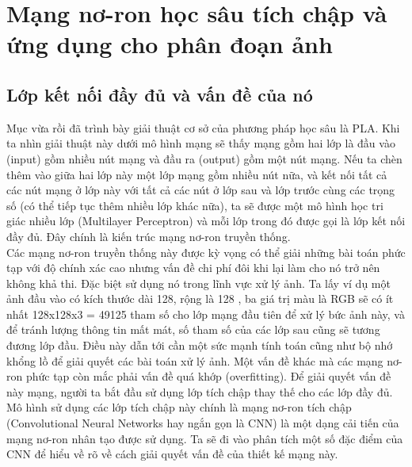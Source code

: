 \section{Mạng nơ-ron học sâu tích chập và ứng dụng cho phân đoạn ảnh}



\subsection{Lớp kết nối đầy đủ và vấn đề của nó}
Mục vừa rồi đã trình bày giải thuật cơ sở của phương pháp học sâu là PLA. Khi ta nhìn giải thuật này dưới mô hình mạng sẽ thấy mạng gồm hai lớp là đầu vào (input) gồm nhiều nút mạng và đầu ra (output) gồm một nút mạng. Nếu ta chèn thêm vào giữa hai lớp này một lớp mạng gồm nhiều nút nữa, và kết nối tất cả các nút mạng ở lớp này với tất cả các nút ở lớp sau và lớp trước cùng các trọng số (có thể tiếp tục thêm nhiều lớp khác nữa), ta sẽ được một mô hình học tri giác nhiều lớp (Multilayer Perceptron) và mỗi lớp trong đó được gọi là lớp kết nối đầy đủ. Đây chính là kiến trúc mạng nơ-ron truyền thống.\\
Các mạng nơ-ron truyền thống này được kỳ vọng có thể giải những bài toán phức tạp với độ chính xác cao nhưng vấn đề chi phí đôi khi lại làm cho nó trở nên không khả thi. Đặc biệt sử dụng nó trong lĩnh vực xử lý ảnh. Ta lấy ví dụ một ảnh đầu vào có kích thước dài 128, rộng là 128 , ba giá trị màu là RGB sẽ có ít nhất 128x128x3 = 49125 tham số cho lớp mạng đầu tiên để xử lý bức ảnh này, và để tránh lượng thông tin mất mát, số tham số của các lớp sau cũng sẽ tương đương lớp đầu. Điều này dẫn tới cần một sức mạnh tính toán cũng như bộ nhớ khổng lồ để giải quyết các bài toán xử lý ảnh. Một vấn đề khác mà các mạng nơ-ron phức tạp còn mắc phải vấn đề quá khớp (overfitting). Để giải quyết vấn đề này mạng, người ta bắt đầu sử dụng lớp tích chập thay thế cho các lớp đầy đủ. Mô hình sử dụng các lớp tích chập này chính là mạng nơ-ron tích chập (Convolutional Neural Networks hay ngắn gọn là CNN) là một dạng cải tiến của mạng nơ-ron nhân tạo được sử dụng. Ta sẽ đi vào phân tích một số đặc điểm của CNN để hiểu về rõ về cách giải quyết vấn đề của thiết kế mạng này.

